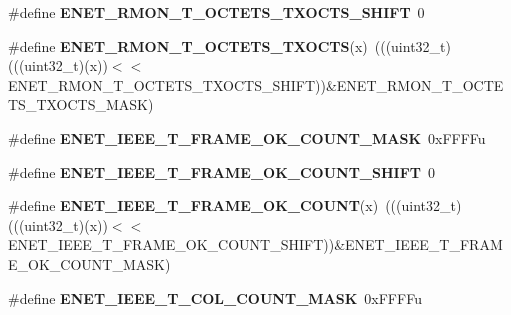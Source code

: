 \begin{DoxyCompactItemize}
\item 
\#define {\bfseries E\+N\+E\+T\+\_\+\+R\+M\+O\+N\+\_\+\+T\+\_\+\+O\+C\+T\+E\+T\+S\+\_\+\+T\+X\+O\+C\+T\+S\+\_\+\+S\+H\+I\+FT}~0\hypertarget{group__ENET__Register__Masks_gacd37d2d1ea131990ecfbae1a3c933f92}{}\label{group__ENET__Register__Masks_gacd37d2d1ea131990ecfbae1a3c933f92}

\item 
\#define {\bfseries E\+N\+E\+T\+\_\+\+R\+M\+O\+N\+\_\+\+T\+\_\+\+O\+C\+T\+E\+T\+S\+\_\+\+T\+X\+O\+C\+TS}(x)~(((uint32\+\_\+t)(((uint32\+\_\+t)(x))$<$$<$E\+N\+E\+T\+\_\+\+R\+M\+O\+N\+\_\+\+T\+\_\+\+O\+C\+T\+E\+T\+S\+\_\+\+T\+X\+O\+C\+T\+S\+\_\+\+S\+H\+I\+FT))\&E\+N\+E\+T\+\_\+\+R\+M\+O\+N\+\_\+\+T\+\_\+\+O\+C\+T\+E\+T\+S\+\_\+\+T\+X\+O\+C\+T\+S\+\_\+\+M\+A\+SK)\hypertarget{group__ENET__Register__Masks_ga26928891c693eebf6309fdb2e2152615}{}\label{group__ENET__Register__Masks_ga26928891c693eebf6309fdb2e2152615}

\item 
\#define {\bfseries E\+N\+E\+T\+\_\+\+I\+E\+E\+E\+\_\+\+T\+\_\+\+F\+R\+A\+M\+E\+\_\+\+O\+K\+\_\+\+C\+O\+U\+N\+T\+\_\+\+M\+A\+SK}~0x\+F\+F\+F\+Fu\hypertarget{group__ENET__Register__Masks_ga23f952e4fec141cb90d9847d74dd50f0}{}\label{group__ENET__Register__Masks_ga23f952e4fec141cb90d9847d74dd50f0}

\item 
\#define {\bfseries E\+N\+E\+T\+\_\+\+I\+E\+E\+E\+\_\+\+T\+\_\+\+F\+R\+A\+M\+E\+\_\+\+O\+K\+\_\+\+C\+O\+U\+N\+T\+\_\+\+S\+H\+I\+FT}~0\hypertarget{group__ENET__Register__Masks_gab12c920d9e9f6383e5981fb59764e3a9}{}\label{group__ENET__Register__Masks_gab12c920d9e9f6383e5981fb59764e3a9}

\item 
\#define {\bfseries E\+N\+E\+T\+\_\+\+I\+E\+E\+E\+\_\+\+T\+\_\+\+F\+R\+A\+M\+E\+\_\+\+O\+K\+\_\+\+C\+O\+U\+NT}(x)~(((uint32\+\_\+t)(((uint32\+\_\+t)(x))$<$$<$E\+N\+E\+T\+\_\+\+I\+E\+E\+E\+\_\+\+T\+\_\+\+F\+R\+A\+M\+E\+\_\+\+O\+K\+\_\+\+C\+O\+U\+N\+T\+\_\+\+S\+H\+I\+FT))\&E\+N\+E\+T\+\_\+\+I\+E\+E\+E\+\_\+\+T\+\_\+\+F\+R\+A\+M\+E\+\_\+\+O\+K\+\_\+\+C\+O\+U\+N\+T\+\_\+\+M\+A\+SK)\hypertarget{group__ENET__Register__Masks_ga0d9fd1a5ed3e423377b644d61c9ee6a4}{}\label{group__ENET__Register__Masks_ga0d9fd1a5ed3e423377b644d61c9ee6a4}

\item 
\#define {\bfseries E\+N\+E\+T\+\_\+\+I\+E\+E\+E\+\_\+\+T\+\_\+C\+O\+L\+\_\+\+C\+O\+U\+N\+T\+\_\+\+M\+A\+SK}~0x\+F\+F\+F\+Fu\hypertarget{group__ENET__Register__Masks_ga7306aeb15187e2182972050a1dad04f1}{}\label{group__ENET__Register__Masks_ga7306aeb15187e2182972050a1dad04f1}


\end{DoxyCompactItemize}
